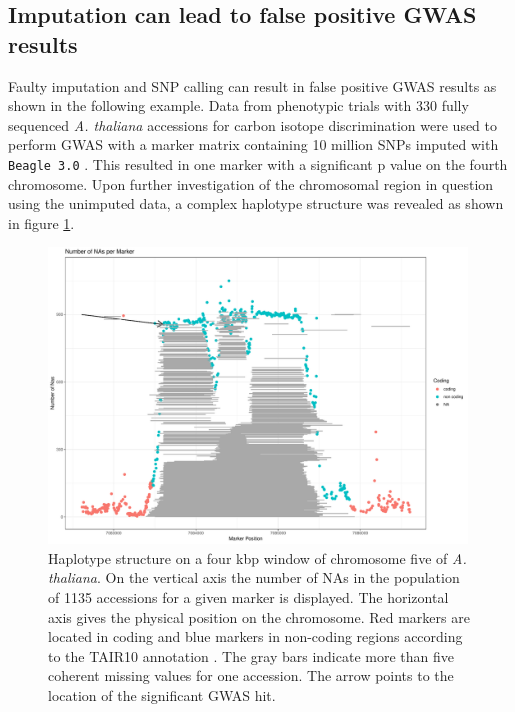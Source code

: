\subsection{Imputation can lead to false positive GWAS results}

Faulty imputation and SNP calling can result in false positive GWAS results as shown in
the following example. Data from phenotypic trials with 330 fully sequenced
\textit{A. thaliana} accessions for carbon isotope discrimination were used to perform
GWAS with a marker matrix containing 10 million SNPs imputed with \texttt{Beagle 3.0}
\cite{dittberner2018natural}. This resulted in one marker with a significant p value on
the fourth chromosome. Upon further investigation of the chromosomal region in question
using the unimputed data, a complex haplotype structure was revealed as shown in figure
\ref{fig:chr_jul}.

\begin{figure}[H]
\centering
\includegraphics[height=.55\textheight, width=0.99\textwidth]{Figures/plot_NAs_AT}
\decoRule
\caption[Haplotype structure on a 1 kbp window of chromosome 4 of
\textit{A. thaliana}]{Haplotype structure on a four kbp window of chromosome five of
 \textit{A. thaliana}. On the vertical axis the number of NAs in the population of 1135
 accessions for a given marker is displayed. The horizontal axis gives the physical
 position on the chromosome. Red markers are located in coding and blue markers in
 non-coding regions according to the TAIR10 annotation \cite{rhee2003arabidopsis}. The
 gray bars indicate more than five coherent missing values for one accession. The arrow
 points to the location of the significant GWAS hit.}
\label{fig:chr_jul}
\end{figure}

